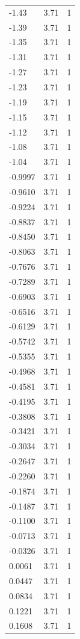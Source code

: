 \begin{longtable}{lrr}
  -1.43 & 3.71 & 1 \\
  -1.39 & 3.71 & 1 \\
  -1.35 & 3.71 & 1 \\
  -1.31 & 3.71 & 1 \\
  -1.27 & 3.71 & 1 \\
  -1.23 & 3.71 & 1 \\
  -1.19 & 3.71 & 1 \\
  -1.15 & 3.71 & 1 \\
  -1.12 & 3.71 & 1 \\
  -1.08 & 3.71 & 1 \\
  -1.04 & 3.71 & 1 \\
  -0.9997 & 3.71 & 1 \\
  -0.9610 & 3.71 & 1 \\
  -0.9224 & 3.71 & 1 \\
  -0.8837 & 3.71 & 1 \\
  -0.8450 & 3.71 & 1 \\
  -0.8063 & 3.71 & 1 \\
  -0.7676 & 3.71 & 1 \\
  -0.7289 & 3.71 & 1 \\
  -0.6903 & 3.71 & 1 \\
  -0.6516 & 3.71 & 1 \\
  -0.6129 & 3.71 & 1 \\
  -0.5742 & 3.71 & 1 \\
  -0.5355 & 3.71 & 1 \\
  -0.4968 & 3.71 & 1 \\
  -0.4581 & 3.71 & 1 \\
  -0.4195 & 3.71 & 1 \\
  -0.3808 & 3.71 & 1 \\
  -0.3421 & 3.71 & 1 \\
  -0.3034 & 3.71 & 1 \\
  -0.2647 & 3.71 & 1 \\
  -0.2260 & 3.71 & 1 \\
  -0.1874 & 3.71 & 1 \\
  -0.1487 & 3.71 & 1 \\
  -0.1100 & 3.71 & 1 \\
  -0.0713 & 3.71 & 1 \\
  -0.0326 & 3.71 & 1 \\
  0.0061 & 3.71 & 1 \\
  0.0447 & 3.71 & 1 \\
  0.0834 & 3.71 & 1 \\
  0.1221 & 3.71 & 1 \\
  0.1608 & 3.71 & 1 \\

\end{longtable}
